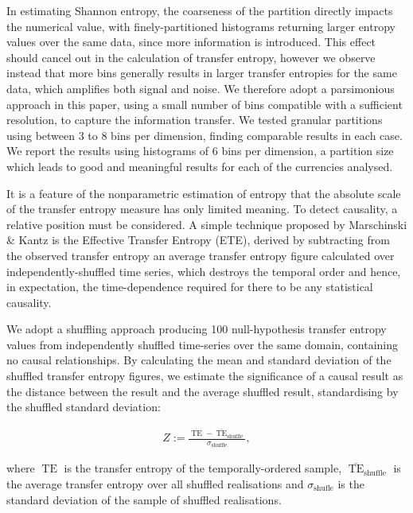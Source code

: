 \documentclass[]{rsos}%
\begin{document}
{  In estimating Shannon entropy, the coarseness of the partition directly impacts the numerical value, with finely-partitioned histograms returning larger entropy values over the same data, since more information is introduced. This effect should cancel out in the calculation of transfer entropy, however we observe instead that more bins generally results in larger transfer entropies for the same data, which amplifies both signal and noise. We therefore adopt a parsimonious approach in this paper, using a small number of bins compatible with a sufficient resolution, to capture the information transfer. 
  We tested granular partitions using between 3 to 8 bins per dimension, finding comparable results in each case. We report the results using histograms of 6 bins per dimension, a partition size which leads to good and meaningful results for each of the currencies analysed.

  
  It is a feature of the nonparametric estimation of entropy that the absolute scale of the transfer entropy measure has only limited meaning. To detect causality, a relative position must be considered. A simple technique proposed by Marschinski \& Kantz \cite{Marschinski2002} is the Effective Transfer Entropy (ETE), derived by subtracting from the observed transfer entropy an average transfer entropy figure calculated over independently-shuffled time series, which destroys the temporal order and hence, in expectation, the time-dependence required for there to be any statistical causality.

  We adopt a shuffling approach producing 100 null-hypothesis transfer entropy values from independently shuffled time-series over the same domain, containing no causal relationships. By calculating the mean and standard deviation of the shuffled transfer entropy figures, we estimate the significance of a causal result as the distance between the result and the average shuffled result, standardising by the shuffled standard deviation:
  
  \begin{eqnarray}
    \label{eq:Z-score}
    Z := \frac{\operatorname{TE} - \bar{\operatorname{TE}}_{\operatorname{shuffle}}}
              {\sigma_{\operatorname{shuffle}}} ,
  \end{eqnarray}
  
  where $\operatorname{TE}$ is the transfer entropy of the temporally-ordered sample, $\bar{\operatorname{TE}}_{\operatorname{shuffle}}$ is the average transfer entropy over all shuffled realisations and $\sigma_{\operatorname{shufle}} $ is the standard deviation of the sample of shuffled realisations.
  
}
\end{document}
